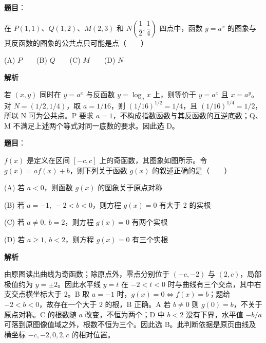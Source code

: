 \begin{answer}

\textbf{题目}：

在 \(P(1,1)\text{、}Q(1,2)\text{、}M(2,3)\) 和 \(N\left(\dfrac12,\dfrac14\right)\) 四点中，函数 \(y=a^x\) 的图象与其反函数的图象的公共点只可能是点\mbox{（　　）}

    (A) \(P\)　　(B) \(Q\)　　(C) \(M\)　　(D) \(N\)

\textbf{解析}

若 \((x,y)\) 同时在 \(y=a^x\) 与反函数 \(y=\log_a x\) 上，则等价于
\(y=a^x\) 且 \(x=a^y\)。对 \(N=(1/2,1/4)\)，取 \(a=1/16\)，则
\((1/16)^{1/2}=1/4\)，且 \((1/16)^{1/4}=1/2\)，所以 N 可为公共点。P 要求 \(a=1\)，不构成指数函数与其反函数的互逆底数；Q、M 不满足上述两个等式对同一底数的要求。因此选 D。


\end{answer}
\begin{answer}

\textbf{题目}：

\(f(x)\) 是定义在区间 \([-c,c]\) 上的奇函数，其图象如图所示。令 \(g(x)=af(x)+b\)，则下列关于函数 \(g(x)\) 的叙述正确的是\mbox{（　　）}

    (A) 若 \(a<0\)，则函数 \(g(x)\) 的图象关于原点对称

    (B) 若 \(a=-1,\ -2<b<0\)，则方程 \(g(x)=0\) 有大于 2 的实根

    (C) 若 \(a\ne0,\ b=2\)，则方程 \(g(x)=0\) 有两个实根

    (D) 若 \(a\ge1,\ b<2\)，则方程 \(g(x)=0\) 有三个实根
\nopagebreak[4]
\begin{center}\end{center}
\nopagebreak[4]
\textbf{解析}

由原图读出曲线为奇函数；除原点外，零点分别位于 \((-c,-2)\) 与 \((2,c)\)，局部极值约为 \(y=\pm2\)。因此水平线 \(y=t\) 在 \(-2<t<0\) 时与曲线有三个交点，其中右支交点横坐标大于 2。B 取 \(a=-1\) 时，\(g(x)=0\iff f(x)=b\)；题给 \(-2<b<0\)，故存在一个大于 2 的根，B 正确。A 若 \(b\ne0\) 则 \(g(0)=b\)，不关于原点对称。C 的根数随 \(a\) 改变，不恒为两个；D 中 \(b<2\) 没有下界，水平值 \(-b/a\) 可落到原图像值域之外，根数不恒为三个。因此选 B。此判断依据是原页曲线及横坐标 \(-c,-2,0,2,c\) 的相对位置。


\end{answer}

